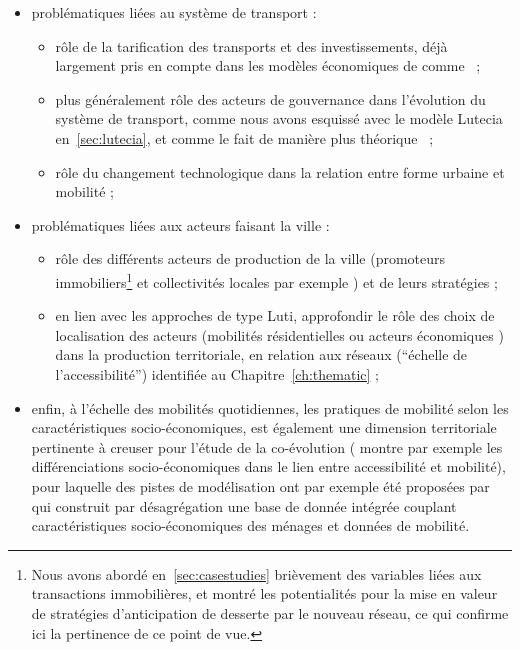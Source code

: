 \begin{itemize}
	\item problématiques liées au système de transport :
	\begin{itemize}
	\item rôle de la tarification des transports et des investissements, déjà largement pris en compte dans les modèles économiques de  comme~\cite{levinson2007co} ;
	\item plus généralement rôle des acteurs de gouvernance dans l'évolution du système de transport, comme nous avons esquissé avec le modèle Lutecia en~\ref{sec:lutecia}, et comme le fait de manière plus théorique~\cite{Xie2011} ;
	\item rôle du changement technologique dans la relation entre forme urbaine et mobilité \cite{brotchie1984technological} ;
	\end{itemize}
	\item problématiques liées aux acteurs faisant la ville :
	\begin{itemize}
	\item rôle des différents acteurs de production de la ville (promoteurs immobiliers\footnote{Nous avons abordé en~\ref{sec:casestudies} brièvement des variables liées aux transactions immobilières, et montré les potentialités pour la mise en valeur de stratégies d'anticipation de desserte par le nouveau réseau, ce qui confirme ici la pertinence de ce point de vue.} et collectivités locales par exemple \cite{le2010acteurs}) et de leurs stratégies ;
	\item en lien avec les approches de type Luti, approfondir le rôle des choix de localisation des acteurs (mobilités résidentielles ou acteurs économiques \cite{tannier2003trois}) dans la production territoriale, en relation aux réseaux (``échelle de l'accessibilité'') identifiée au Chapitre~\ref{ch:thematic} ;
	\end{itemize}
	\item enfin, à l'échelle des mobilités quotidiennes, les pratiques de mobilité selon les caractéristiques socio-économiques, est également une dimension territoriale pertinente à creuser pour l'étude de la co-évolution (\cite{cerqueira2017inegalites} montre par exemple les différenciations socio-économiques dans le lien entre accessibilité et mobilité), pour laquelle des pistes de modélisation ont par exemple été proposées par~\cite{morency2005contributions} qui construit par désagrégation une base de donnée intégrée couplant caractéristiques socio-économiques des ménages et données de mobilité.
\end{itemize}


